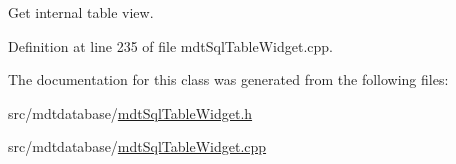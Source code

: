 Get internal table view. 



Definition at line 235 of file mdt\-Sql\-Table\-Widget.\-cpp.



The documentation for this class was generated from the following files\-:\begin{DoxyCompactItemize}
\item 
src/mdtdatabase/\hyperlink{mdt_sql_table_widget_8h}{mdt\-Sql\-Table\-Widget.\-h}\item 
src/mdtdatabase/\hyperlink{mdt_sql_table_widget_8cpp}{mdt\-Sql\-Table\-Widget.\-cpp}\end{DoxyCompactItemize}
